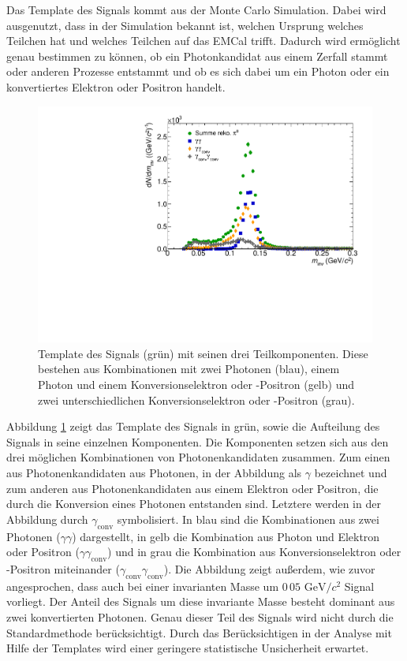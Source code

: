 Das Template des Signals kommt aus der Monte Carlo Simulation.
Dabei wird ausgenutzt, dass in der Simulation bekannt ist, welchen Ursprung welches Teilchen hat und welches Teilchen auf das EMCal trifft.
Dadurch wird ermöglicht genau bestimmen zu können, ob ein Photonkandidat aus einem Zerfall stammt oder anderen Prozesse entstammt und ob es sich dabei um ein Photon oder ein konvertiertes Elektron oder Positron handelt.
\begin{figure}[tp]
\centering
\includegraphics[width=.75\linewidth]{PeakTemplateMotivation10_Data_2016.pdf}
\caption{Template des Signals (grün) mit seinen drei Teilkomponenten.
Diese bestehen aus Kombinationen mit zwei Photonen (blau), einem Photon und einem Konversionselektron oder -Positron (gelb) und zwei unterschiedlichen Konversionselektron oder -Positron (grau).}
\label{fig:SigTemp}
\end{figure}
\newline
Abbildung \ref{fig:SigTemp} zeigt das Template des Signals in grün, sowie die Aufteilung des Signals in seine einzelnen Komponenten.
Die Komponenten setzen sich aus den drei möglichen Kombinationen von Photonenkandidaten zusammen.
Zum einen aus Photonenkandidaten aus Photonen, in der Abbildung als $\gamma$ bezeichnet und zum anderen aus Photonenkandidaten aus einem Elektron oder Positron, die durch die Konversion  eines Photonen entstanden sind.
Letztere werden in der Abbildung durch $\gamma_\text{conv}$ symbolisiert.
\newline
In blau sind die Kombinationen aus zwei Photonen ($\gamma\gamma$) dargestellt, in gelb die Kombination aus Photon und Elektron oder Positron ($\gamma\gamma_\text{conv}$) und in grau die Kombination aus Konversionselektron oder -Positron miteinander ($\gamma_\text{conv}\gamma_\text{conv}$).
\newline
Die Abbildung zeigt außerdem, wie zuvor angesprochen, dass auch bei einer invarianten Masse um $0\,05 \text{ GeV}/c^{2}$ Signal vorliegt.
Der Anteil des Signals um diese invariante Masse besteht dominant aus zwei konvertierten Photonen.
Genau dieser Teil des Signals wird nicht durch die Standardmethode berücksichtigt.
Durch das Berücksichtigen in der Analyse mit Hilfe der Templates wird einer geringere statistische Unsicherheit erwartet.